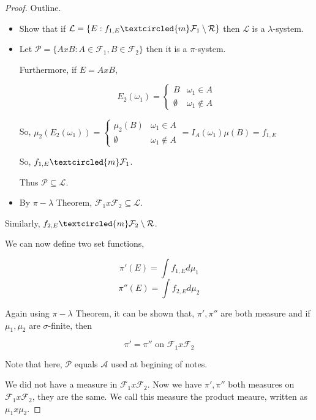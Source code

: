 \documentclass[11pt,fleqn]{book} %
\begin{document}
\begin{enumerate}
\begin{theorem}
			\end{theorem}

	\begin{proof}
		Outline. 

			\begin{itemize}
				\item Show that if $\mathcal{L} = \{E: f_{1, E} \textcircled{m} \mathcal{F}_1 \setminus \mathcal{R}\}$ then $\mathcal{L}$ is a $\lambda$-system. 
				\item Let $\mathcal{P} = \{AxB: A \in \mathcal{F}_1, B \in \mathcal{F}_2\}$ then it is a $\pi$-system.
			

				Furthermore, if $ E = A x B$, 
				
						$$E_2(\omega_1) = \left\{ \begin{array}{ll}
							B & \omega_1 \in A\\
							\emptyset & \omega_1 \notin A
						\end{array} \right. $$	

				So, $\mu_2(E_2(\omega_1)) = \left\{ \begin{array}{ll}
							\mu_2(B) & \omega_1 \in A\\
							\emptyset & \omega_1 \notin A
						\end{array} \right. = I_A(\omega_1)\mu(B) = f_{1, E}$

				So, $f_{1, E} \textcircled{m} \mathcal{F}_1$. 

				Thus $\mathcal{P} \subseteq \mathcal{L}$. 	
				
				\item By $\pi-\lambda$ Theorem, $\mathcal{F}_1 x \mathcal{F}_2 \subseteq \mathcal{L}$. 

	\end{itemize}

		Similarly, $f_{2, E} \textcircled{m} \mathcal{F}_2 \setminus \mathcal{R}$. 

		We can now define two set functions, 

				$$\pi'(E) = \int f_{1, E} d\mu_1 $$
				$$\pi''(E) = \int f_{2, E} d\mu_2 $$

		Again using $\pi-\lambda$ Theorem, it can be shown that, $\pi', \pi''$ are both measure and if $\mu_1, \mu_2$ are $\sigma$-finite, then

				$$\pi' = \pi'' \text{ on } \mathcal{F}_1 x \mathcal{F}_2 $$

		Note that here, $\mathcal{P}$ equals $\mathcal{A}$ used at begining	of notes.


		We did not have a measure in $\mathcal{F}_1 x \mathcal{F}_2$. Now we have $\pi', \pi''$ both measures on $\mathcal{F}_1 x \mathcal{F}_2$, they are the same. We call this measure the product meaure, written as $\mu_1 x \mu_2$. 



\end{proof}
\end{enumerate}
\end{document}
